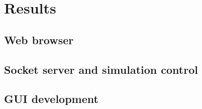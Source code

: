 \chapter{Results}
\label{cha:results}




\section{Web browser}



\section{Socket server and simulation control}
\section{GUI development}
